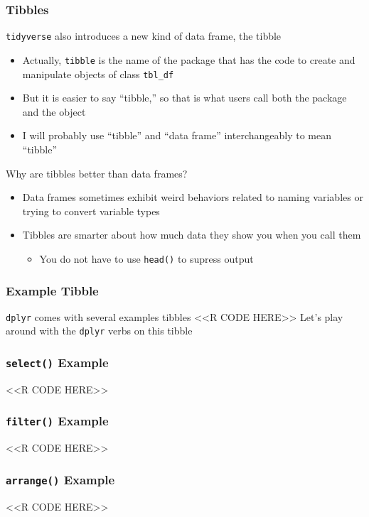 \documentclass{beamer}
\begin{document}
\begin{frame}\frametitle{Tibbles}
    \texttt{tidyverse} also introduces a new kind of data frame, the tibble
    \begin{itemize}
        \item Actually, \texttt{tibble} is the name of the package that has the code to create and manipulate objects of class \texttt{tbl\_df}
        \item But it is easier to say ``tibble,'' so that is what users call both the package and the object
        \item I will probably use ``tibble'' and  ``data frame'' interchangeably to mean ``tibble''
    \end{itemize}
    \vspace{2ex}
    Why are tibbles better than data frames?
    \begin{itemize}
        \item Data frames sometimes exhibit weird behaviors related to naming variables or trying to convert variable types
        \item Tibbles are smarter about how much data they show you when you call them
        \begin{itemize}
            \item You do not have to use \texttt{head()} to supress output
        \end{itemize}
    \end{itemize}
\end{frame}

\begin{frame}[fragile]\frametitle{Example Tibble}
    \texttt{dplyr} comes with several examples tibbles
    <<R CODE HERE>>
    \vspace{1ex}
    Let's play around with the \texttt{dplyr} verbs on this tibble
\end{frame}

\begin{frame}[fragile]\frametitle{\texttt{select()} Example}
    <<R CODE HERE>>
\end{frame}

\begin{frame}[fragile]\frametitle{\texttt{filter()} Example}
    <<R CODE HERE>>
\end{frame}

\begin{frame}[fragile]\frametitle{\texttt{arrange()} Example}
    <<R CODE HERE>>
\end{frame}
\end{document}
